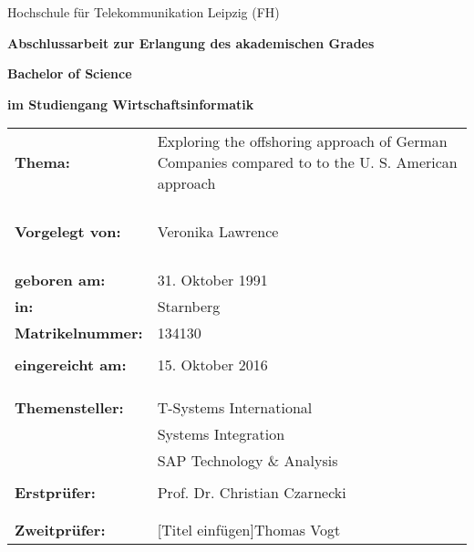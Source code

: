 
\thispagestyle{empty}
\vspace{1cm}

\begin{center}
\Large{Hochschule für Telekommunikation Leipzig (FH)}
\vspace{1.5cm}
\end{center}

\begin{center}
\large{\textbf{Abschlussarbeit zur Erlangung des akademischen Grades}}
\end{center}

\begin{center}
\vspace{-2mm}
 \Large\textbf{Bachelor of Science}
\end{center}

\begin{center}
\vspace{5mm}
\textbf{im Studiengang Wirtschaftsinformatik}
\end{center}

\vspace{3cm}
\begin{tabular}{p{}p{}}
\textbf{Thema:} & 
	Exploring the offshoring approach of German Companies compared to  to the U. S. American approach

\\
&
	
\\ &
\\ &
\\

\vspace{4,5cm}\\

\textbf{Vorgelegt von:} & Veronika Lawrence \\ 
&\\
&\\
&\\
&\\
\textbf{geboren am:} & 31. Oktober 1991 \\
\textbf{in:} & Starnberg \\
\textbf{Matrikelnummer: } & {}134130\\
&\\

\textbf{eingereicht am:} & 15. Oktober 2016 \\
&\\
&\\
&\\
\textbf{Themensteller:} & T-Systems International\\
& Systems Integration\\
& SAP Technology \& Analysis\\
& \\

\textbf{Erstprüfer:} & Prof. Dr. Christian Czarnecki \\
&\\
&\\

\textbf{Zweitprüfer:} & [Titel einfügen]Thomas Vogt \\
\end{tabular}
 